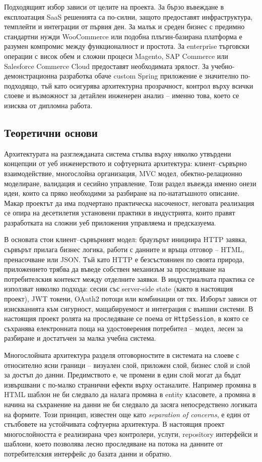 Подходящият избор зависи от целите на проекта. За бързо въвеждане в експлоатация SaaS решенията са по-силни, защото предоставят инфраструктура, темплейти и интеграции от първия ден. За малък и среден бизнес с предимно стандартни нужди WooCommerce или подобна плъгин-базирана платформа е разумен компромис между функционалност и простота. За enterprise търговски операции с висок обем и сложни процеси Magento, SAP Commerce или Salesforce Commerce Cloud предоставят необходимата зрялост. За учебно-демонстрационна разработка обаче custom Spring приложение е значително по-подходящо, тъй като осигурява архитектурна прозрачност, контрол върху всички слоеве и възможност за детайлен инженерен анализ -- именно това, което се изисква от дипломна работа.

\subsection{Теоретични основи}

Архитектурата на разглежданата система стъпва върху няколко утвърдени концепции от уеб инженерството и софтуерната архитектура: клиент--сървърно взаимодействие, многослойна организация, MVC модел, обектно-релационно моделиране, валидация и сесийно управление. Този раздел въвежда именно онези идеи, които са пряко необходими за разбиране на по-нататъшното описание. Макар проектът да има подчертано практическа насоченост, неговата реализация се опира на десетилетия установени практики в индустрията, които правят разработката на сложни уеб приложения управляема и предсказуема.

В основата стои клиент--сървърният модел: браузърът инициира HTTP заявка, сървърът прилага бизнес логика, работи с данните и връща отговор -- HTML, пренасочване или JSON. Тъй като HTTP е безсъстояниен по своята природа, приложението трябва да въведе собствен механизъм за проследяване на потребителския контекст между отделните заявки. В индустриалната практика се използват няколко подхода: сесии със server-side state (както в настоящия проект), JWT токени, OAuth2 потоци или комбинации от тях. Изборът зависи от изискванията към сигурност, мащабируемост и интеграция с външни системи. В настоящия проект ролята на проследяване се поема от \texttt{HttpSession}, в която се съхранява електронната поща на удостоверения потребител -- модел, лесен за разбиране и достатъчен за малка учебна система.

Многослойната архитектура \cite{fowler,sommerville} разделя отговорностите в системата на слоеве с относително ясни граници -- визуален слой, приложен слой, бизнес слой и слой за достъп до данни. Предимството е, че промени в един слой могат да бъдат извършвани с по-малко странични ефекти върху останалите. Например промяна в HTML шаблон не би следвало да налага промяна в entity класовете, а промяна в начина на съхранение на данни не би следвало да засяга непосредствено логиката на формите. Този принцип, известен още като \textit{separation of concerns}, е един от стълбовете на устойчивата софтуерна архитектура. В настоящия проект многослойността е реализирана чрез контролери, услуги, repository интерфейси и шаблони, което позволява лесно проследяване на потока на данните от потребителския интерфейс до базата данни и обратно.

